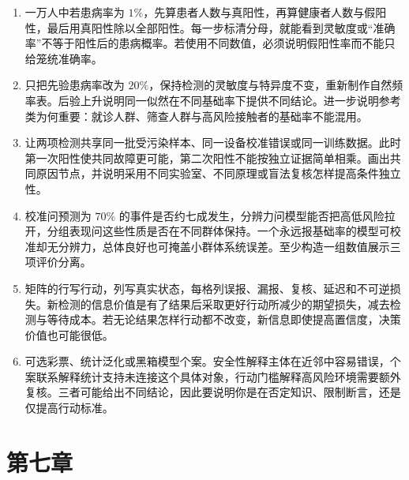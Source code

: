 \begin{enumerate}
\item 一万人中若患病率为 \(1\%\)，先算患者人数与真阳性，再算健康者人数与假阳性，最后用真阳性除以全部阳性。每一步标清分母，就能看到灵敏度或“准确率”不等于阳性后的患病概率。若使用不同数值，必须说明假阳性率而不能只给笼统准确率。
\item 只把先验患病率改为 \(20\%\)，保持检测的灵敏度与特异度不变，重新制作自然频率表。后验上升说明同一似然在不同基础率下提供不同结论。进一步说明参考类为何重要：就诊人群、筛查人群与高风险接触者的基础率不能混用。
\item 让两项检测共享同一批受污染样本、同一设备校准错误或同一训练数据。此时第一次阳性使共同故障更可能，第二次阳性不能按独立证据简单相乘。画出共同原因节点，并说明采用不同实验室、不同原理或盲法复核怎样提高条件独立性。
\item 校准问预测为 \(70\%\) 的事件是否约七成发生，分辨力问模型能否把高低风险拉开，分组表现问这些性质是否在不同群体保持。一个永远报基础率的模型可校准却无分辨力，总体良好也可掩盖小群体系统误差。至少构造一组数值展示三项评价分离。
\item 矩阵的行写行动，列写真实状态，每格列误报、漏报、复核、延迟和不可逆损失。新检测的信息价值是有了结果后采取更好行动所减少的期望损失，减去检测与等待成本。若无论结果怎样行动都不改变，新信息即使提高置信度，决策价值也可能很低。
\item 可选彩票、统计泛化或黑箱模型个案。安全性解释主体在近邻中容易错误，个案联系解释统计支持未连接这个具体对象，行动门槛解释高风险环境需要额外复核。三者可能给出不同结论，因此要说明你是在否定知识、限制断言，还是仅提高行动标准。
\end{enumerate}

\section*{第七章}

